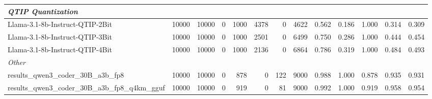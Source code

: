 \begin{table}[htbp]
{\begin{tabular}{lrrrrrrrrrrrr}
    \multicolumn{13}{l}{\textit{QTIP Quantization}} \\
    \midrule
    Llama-3.1-8b-Instruct-QTIP-2Bit & 10000 & 10000 & 0 & 1000 & 4378 & 0 & 4622 & 0.562 & 0.186 & 1.000 & 0.314 & 0.309 \\
    Llama-3.1-8b-Instruct-QTIP-3Bit & 10000 & 10000 & 0 & 1000 & 2501 & 0 & 6499 & 0.750 & 0.286 & 1.000 & 0.444 & 0.454 \\
    Llama-3.1-8b-Instruct-QTIP-4Bit & 10000 & 10000 & 0 & 1000 & 2136 & 0 & 6864 & 0.786 & 0.319 & 1.000 & 0.484 & 0.493 \\
    \midrule
    \multicolumn{13}{l}{\textit{Other}} \\
    \midrule
    results\_qwen3\_coder\_30B\_a3b\_fp8 & 10000 & 10000 & 0 & 878 & 0 & 122 & 9000 & 0.988 & 1.000 & 0.878 & 0.935 & 0.931 \\
    results\_qwen3\_coder\_30B\_a3b\_fp8\_q4km\_gguf & 10000 & 10000 & 0 & 919 & 0 & 81 & 9000 & 0.992 & 1.000 & 0.919 & 0.958 & \cellcolor{green!10}0.954 \\
    \bottomrule
  \end{tabular}
  }
\end{table}

